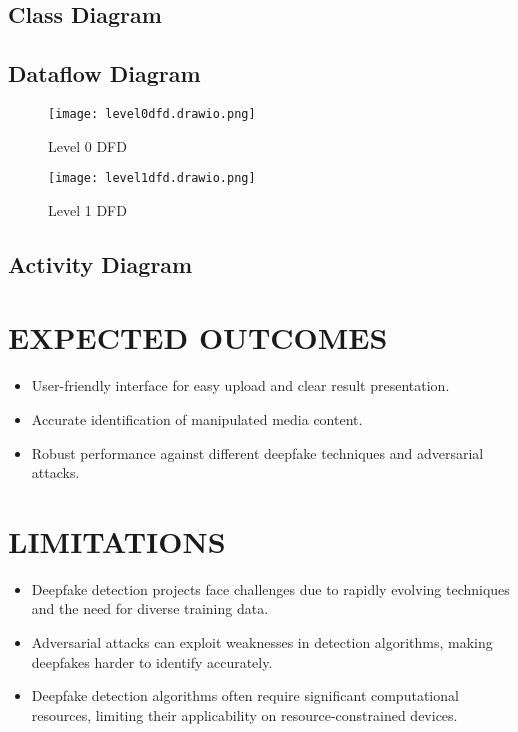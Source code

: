\documentclass[12 pt]{article}
\begin{document}
\subsection{Class Diagram}
\newpage
\subsection{Dataflow Diagram}
\begin{figure}[h]
    \centering
    \texttt{[image: level0dfd.drawio.png]}
    \caption{Level 0 DFD}
\end{figure}\begin{figure}[h]
    \centering
    \texttt{[image: level1dfd.drawio.png]}
    \caption{Level 1 DFD}
\end{figure}
\newpage
\subsection{Activity Diagram}
\newpage


\section{EXPECTED OUTCOMES}
\begin{itemize}
    \item User-friendly interface for easy upload and clear result presentation.
    \item Accurate identification of manipulated media content.
    \item Robust performance against different deepfake techniques and adversarial attacks.
\end{itemize}
\newpage
\section{LIMITATIONS}
\begin{itemize}
    \item Deepfake detection projects face challenges due to rapidly evolving techniques and the need for diverse training data.
    \item Adversarial attacks can exploit weaknesses in detection algorithms, making deepfakes harder to identify accurately.
    \item Deepfake detection algorithms often require significant computational resources, limiting their applicability on resource-constrained devices.
\end{itemize}
\newpage
\end{document}

